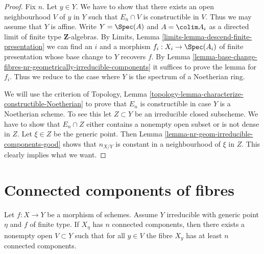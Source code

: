 \begin{proof}
Fix $n$. Let $y \in Y$. We have to show that there exists an open neighbourhood
$V$ of $y$ in $Y$ such that $E_n \cap V$ is constructible in $V$. Thus we may
assume that $Y$ is affine. Write $Y = \Spec(A)$ and
$A = \colim A_i$ as a directed limit of finite type
$\mathbf{Z}$-algebras. By
Limits, Lemma \ref{limits-lemma-descend-finite-presentation}
we can find an $i$ and a morphism $f_i : X_i \to \Spec(A_i)$ of
finite presentation whose base change to $Y$ recovers $f$. By
Lemma \ref{lemma-base-change-fibres-nr-geometrically-irreducible-components}
it suffices to prove the lemma for $f_i$. Thus we reduce to
the case where $Y$ is the spectrum of a Noetherian ring.

\medskip\noindent
We will use the criterion of
Topology, Lemma \ref{topology-lemma-characterize-constructible-Noetherian}
to prove that $E_n$ is constructible in case $Y$ is a Noetherian scheme.
To see this let $Z \subset Y$ be an irreducible closed subscheme.
We have to show that $E_n \cap Z$ either contains a nonempty open subset
or is not dense in $Z$. Let $\xi \in Z$ be the generic point. Then
Lemma \ref{lemma-nr-geom-irreducible-components-good}
shows that $n_{X/Y}$ is constant in a neighbourhood of $\xi$ in $Z$.
This clearly implies what we want.
\end{proof}













\section{Connected components of fibres}
\label{section-connected}

\begin{lemma}
\label{lemma-connected-components-in-neighbourhood}
Let $f : X \to Y$ be a morphism of schemes. Assume $Y$ irreducible with
generic point $\eta$ and $f$ of finite type. If $X_\eta$ has $n$
connected components, then there exists a nonempty open $V \subset Y$
such that for all $y \in V$ the fibre $X_y$ has at least $n$
connected components.
\end{lemma}

